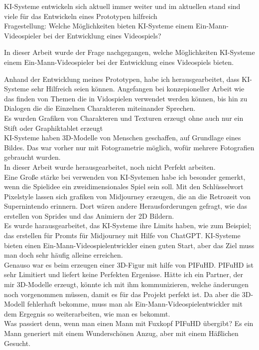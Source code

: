 KI-Systeme entwickeln sich aktuell immer weiter und im aktuellen stand sind viele für das Entwickeln eines Prototypen hilfreich
\\

Fragestellung: Welche Möglichkeiten bieten KI-Systeme einem Ein-Mann-Videospieler bei der Entwicklung eines Videospiels?  

In dieser Arbeit wurde der Frage nachgegangen, welche Möglichkeiten KI-Systeme einem Ein-Mann-Videospieler bei der Entwicklung eines Videospiels bieten. 

Anhand der Entwicklung meines Prototypen, habe ich herausgearbeitet, dass KI-Systeme sehr Hilfreich seien können. Angefangen bei konzepioneller Arbeit wie das finden von Themen die in Vidospielen verwendet werden können, bis hin zu Dialogen die die Einzelnen Charakteren miteinander Sprechen.
\\
Es wurden Grafiken von Charakteren und Texturen erzeugt ohne auch nur ein Stift oder Graphiktablet erzeugt
\\
KI-Systeme haben 3D-Modelle von Menschen geschaffen, auf Grundlage eines Bildes. Das war vorher nur mit Fotogrametrie möglich, wofür mehrere Fotografien gebraucht wurden.
\\
In dieser Arbeit wurde herausgearbeitet, noch nicht Perfekt arbeiten.
\\
Eine Große stärke bei verwenden von KI-Systemen habe ich besonder gemerkt, wenn die Spielidee ein zweidimensionales Spiel sein soll. Mit den Schlüsselwort Pixelstyle lassen sich grafiken von Midjourney erzeugen, die an die Retrozeit von Supernintendo erinnern. Dort wären andere Herausforderungen gefragt, wie das erstellen von Sprides und das Animiern der 2D Bildern.
\\
Es wurde harausgearbeitet, das KI-Systeme ihre Limits haben, wie zum Beispiel; das erstellen für Promts für Midjourney mit Hilfe von ChatGPT. KI-Systeme bieten einen Ein-Mann-Videospielentwickler einen guten Start, aber das Ziel muss man doch sehr häufig alleine erreichen.
\\
Genauso war es  beim erzeugen einer 3D-Figur mit hilfe von PIFuHD. PIFuHD ist sehr Limitiert und liefert keine Perfekten Ergenisse. Hätte ich ein Partner, der mir 3D-Modelle erzeugt, könnte ich mit ihm kommunizieren, welche änderungen noch vorgenommen müssen, damit es für das Projekt perfekt ist. Da aber die 3D-Modell fehlerhaft bekomme, muss man als Ein-Mann-Videospielentwickler mit dem Ergegnis so weiterarbeiten, wie man es bekommt.
\\
Was passiert denn, wenn man einen Mann mit Fuxkopf PIFuHD übergibt? Es ein Mann generiert mit einem Wunderschönen Anzug, aber mit einem Häßlichen Gesucht.
